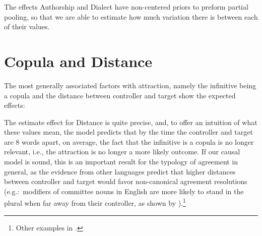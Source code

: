 \documentclass[a4paper, 12pt, article]{memoir}
\begin{document}
The effects Authorship and Dialect have non\hyp{}centered priors to preform
partial pooling, so that we are able to estimate how much variation there is
between each of their values.

\section{Copula and Distance} %

The most generally associated factors with attraction, namely the infinitive
being a copula and the distance between controller and target show the expected
effects:

% 


The estimate effect for Distance is quite precise, and, to offer an intuition of
what these values mean, the model predicts that by the time the controller and
target are 8 words apart, on average, the fact that the infinitive is a copula
is no longer relevant, i.e., the attraction is no longer a more likely outcome.
If our causal model is sound, this is an important result for the typology of
agreement in general, as the evidence from other languages predict that higher
distances between controller and target would favor non\hyp{}canonical agreement
resolutions (e.g.:\ modifiers of committee nouns in English are more likely to
stand in the plural when far away from their controller, as shown by
\textcite[98]{Levin2001}).\footnote{Other examples in
  \textcite[235]{Corbett2006}.}

\end{document}
